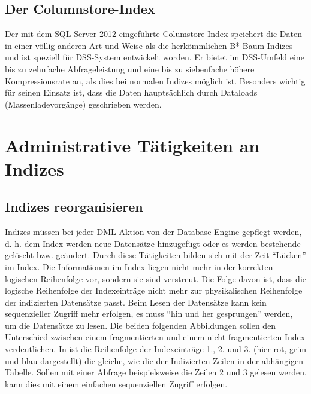       \subsection{Der Columnstore-Index}
        Der mit dem SQL Server 2012 eingeführte Columstore-Index speichert die
        Daten in einer völlig anderen Art und Weise als die herkömmlichen
        B*-Baum-Indizes und ist speziell für DSS-System entwickelt worden. Er
        bietet im DSS-Umfeld eine bis zu zehnfache Abfrageleistung und eine bis
        zu siebenfache höhere Kompressionsrate an, als dies bei normalen Indizes
        möglich ist. Besonders wichtig für seinen Einsatz ist, dass die Daten
        hauptsächlich durch Dataloads (Massenladevorgänge) geschrieben werden.
        \begin{literaturinternet}
          \item \cite{gg492088}
        \end{literaturinternet}
    \section{Administrative Tätigkeiten an Indizes}
      \subsection{Indizes reorganisieren}
        Indizes müssen bei jeder DML-Aktion von der Database Engine gepflegt
        werden, d. h. dem Index werden neue Datensätze hinzugefügt oder es
        werden bestehende gelöscht bzw. geändert. Durch diese Tätigkeiten bilden
        sich mit der Zeit \enquote{Lücken} im Index. Die Informationen im Index
        liegen nicht mehr in der korrekten logischen Reihenfolge vor, sondern
        sie sind verstreut. Die Folge davon ist, dass die logische Reihenfolge
        der Indexeinträge nicht mehr zur physikalischen Reihenfolge der
        indizierten Datensätze passt. Beim Lesen der Datensätze kann kein
        sequenzieller Zugriff mehr erfolgen, es muss \enquote{hin und her
        gesprungen} werden, um die Datensätze zu lesen.
        Die beiden folgenden Abbildungen sollen den Unterschied zwischen einem
        fragmentierten und einem nicht fragmentierten Index verdeutlichen. In
         ist die Reihenfolge der Indexeinträge
        1., 2. und 3. (hier rot, grün und blau dargestellt) die gleiche, wie die
        der Indizierten Zeilen in der abhängigen Tabelle. Sollen mit einer
        Abfrage beispielsweise die Zeilen 2 und 3 gelesen werden, kann dies mit
        einem einfachen sequenziellen Zugriff erfolgen.
        
